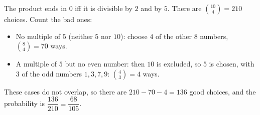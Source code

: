 The product ends in $0$ iff it is divisible by $2$ and by $5$. There are $\binom{10}{4}=210$ choices. Count the bad ones:
\begin{itemize}
\item No multiple of $5$ (neither $5$ nor $10$): choose $4$ of the other $8$ numbers, $\binom84=70$ ways.
\item A multiple of $5$ but no even number: then $10$ is excluded, so $5$ is chosen, with $3$ of the odd numbers $1,3,7,9$: $\binom43=4$ ways.
\end{itemize}
These cases do not overlap, so there are $210-70-4=136$ good choices, and the probability is $\dfrac{136}{210}=\boxed{\dfrac{68}{105}}$.
